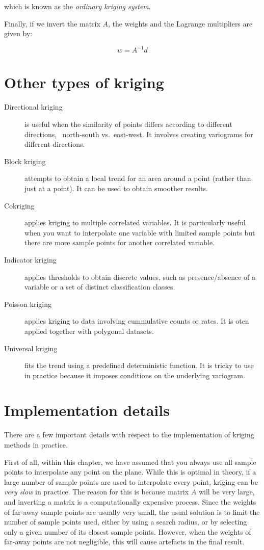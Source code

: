 which is known as the \emph{ordinary kriging system}.

Finally, if we invert the matrix \(A\), the weights and the Lagrange multipliers are given by:

\begin{equation}
w = A^{-1}d
\end{equation}

%
\section{Other types of kriging}

\begin{description}
\item[Directional kriging] is useful when the similarity of points differs according to different directions, \eg\ north-south vs.\ east-west.
It involves creating variograms for different directions.
\item[Block kriging] attempts to obtain a local trend for an area around a point (rather than just at a point).
It can be used to obtain smoother results.
\item[Cokriging] applies kriging to multiple correlated variables.
It is particularly useful when you want to interpolate one variable with limited sample points but there are more sample points for another correlated variable.
\item[Indicator kriging] applies thresholds to obtain discrete values, such as presence/absence of a variable or a set of distinct classification classes.
\item[Poisson kriging] applies kriging to data involving cummulative counts or rates.
It is oten applied together with polygonal datasets.
\item[Universal kriging] fits the trend using a predefined deterministic function.
It is tricky to use in practice because it imposes conditions on the underlying variogram.
\end{description}

%
\section{Implementation details}

There are a few important details with respect to the implementation of kriging methods in practice.

First of all, within this chapter, we have assumed that you always use all sample points to interpolate any point on the plane.
While this is optimal in theory, if a large number of sample points are used to interpolate every point, kriging can be \emph{very slow} in practice.
The reason for this is because matrix \(A\) will be very large, and inverting a matrix is a computationally expensive process.
Since the weights of far-away sample points are usually very small, the usual solution is to limit the number of sample points used, either by using a search radius, or by selecting only a given number of its closest sample points.
However, when the weights of far-away points are not negligible, this will cause artefacts in the final result.

